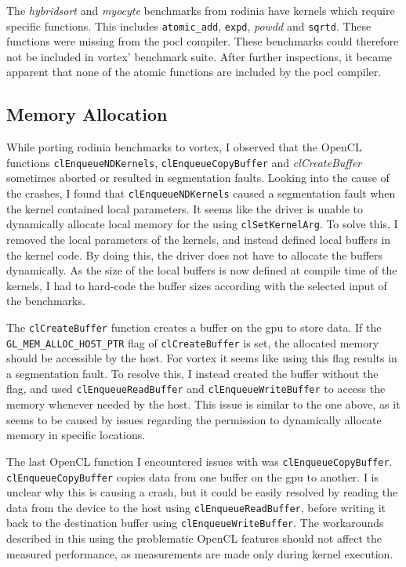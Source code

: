 The \textit{hybridsort} and \textit{myocyte} benchmarks from \Gls{rodinia} have kernels which require specific functions. This includes \texttt{atomic\_add}, \texttt{expd}, \textit{powdd} and \texttt{sqrtd}. These functions were missing from the \Gls{pocl} compiler. These benchmarks could therefore not be included in \Gls{vortex}' benchmark suite. After further inspections, it became apparent that none of the atomic functions are included by the \Gls{pocl} compiler. 

\subsection{Memory Allocation} \label{sec:memory_alloc}

While porting \Gls{rodinia} benchmarks to \Gls{vortex}, I observed that the OpenCL functions \texttt{clEnqueueNDKernels}, \texttt{clEnqueueCopyBuffer} and \textit{clCreateBuffer} sometimes aborted or resulted in segmentation faults. Looking into the cause of the crashes, I found that \texttt{clEnqueueNDKernels} caused a segmentation fault when the kernel contained local parameters. It seems like the driver is unable to dynamically allocate local memory for the  using \texttt{clSetKernelArg}. To solve this, I removed the local parameters of the kernels, and instead defined local buffers in the kernel code. By doing this, the driver does not have to allocate the buffers dynamically. As the size of the local buffers is now defined at compile time of the kernels, I had to hard-code the buffer sizes according with the selected input of the benchmarks.

The \texttt{clCreateBuffer} function creates a buffer on the \acrshort{gpu} to store data. If the \texttt{GL\_MEM\_ALLOC\_HOST\_PTR} flag of \texttt{clCreateBuffer} is set, the allocated memory should be accessible by the host. For \Gls{vortex} it seems like using this flag results in a segmentation fault. To resolve this, I instead created the buffer without the flag, and used \texttt{clEnqueueReadBuffer} and \texttt{clEnqueueWriteBuffer} to access the memory whenever needed by the host. This issue is similar to the one above, as it seems to be caused by issues regarding the permission to dynamically allocate memory in specific locations.

The last OpenCL function I encountered issues with was \texttt{clEnqueueCopyBuffer}. \texttt{clEnqueueCopyBuffer} copies data from one buffer on the \acrshort{gpu} to another. I is unclear why this is causing a crash, but it could be easily resolved by reading the data from the device to the host using \texttt{clEnqueueReadBuffer}, before writing it back to the destination buffer using \texttt{clEnqueueWriteBuffer}. The workarounds described in this  using the problematic OpenCL features should not affect the measured performance, as measurements are made only during kernel execution.


